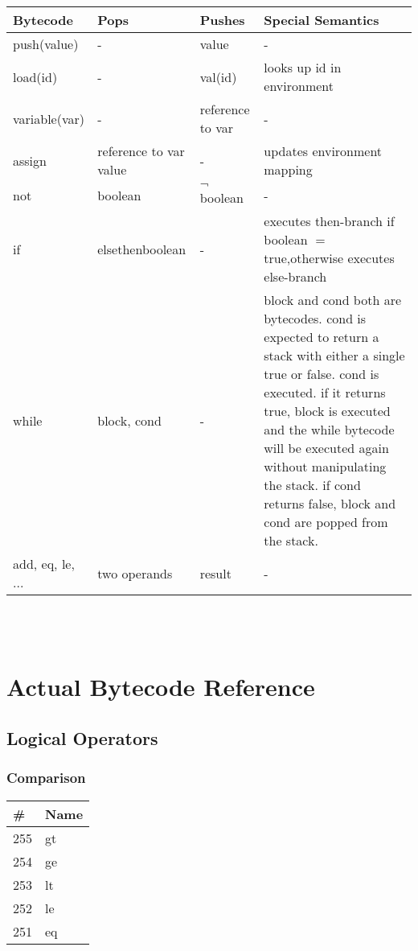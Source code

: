 \documentclass{article}
\begin{document}
\begin{tabularx}{\textwidth}{l|X|l|X}
Bytecode & Pops & Pushes & Special Semantics \\ \hline
push(value) & - & value & - \\ \hline
load(id) & - & val(id) & looks up id in environment \\ \hline
variable(var) & - & reference to var & - \\ \hline
assign & reference to var \newline value & - & updates environment mapping \\ \hline
not & boolean & $\neg$ boolean & - \\ \hline
if & else\newline then\newline boolean & - & executes then-branch if boolean $=$ true,\newline otherwise executes else-branch \\ \hline
while & block, cond & - & block and cond both are bytecodes. \newline cond is expected to return a stack with either a single true or false. \newline cond is executed. if it returns true, block is executed and the while bytecode will be executed again without manipulating the stack. \newline if cond returns false, block and cond are popped from the stack. \\ \hline
add, eq, le, ... & two operands & result  & - \\
\end{tabularx}
\\
\\

\section{Actual Bytecode Reference}
\subsection{Logical Operators}
\subsubsection{Comparison}
\begin{tabular}{l|l}
\# & Name \\ \hline
255 & gt \\ \hline
254 & ge \\ \hline
253 & lt \\ \hline
252 & le \\ \hline
251 & eq \\ \hline
\end{tabular}
\end{document}
